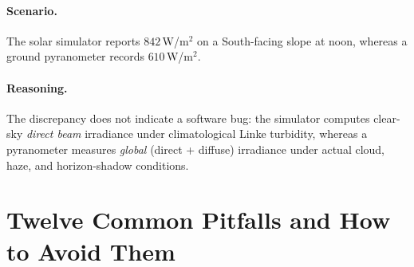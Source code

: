 \documentclass[11pt,a4paper]{article}
\begin{document}
\paragraph{Scenario.} The solar simulator reports $842$\,W/m$^2$ on a South-facing slope at noon, whereas a ground pyranometer records $610$\,W/m$^2$.

\paragraph{Reasoning.} The discrepancy does not indicate a software bug: the simulator computes clear-sky \emph{direct beam} irradiance under climatological Linke turbidity, whereas a pyranometer measures \emph{global} (direct + diffuse) irradiance under actual cloud, haze, and horizon-shadow conditions.

\section{Twelve Common Pitfalls and How to Avoid Them}
\label{sec:errores}
\end{document}
